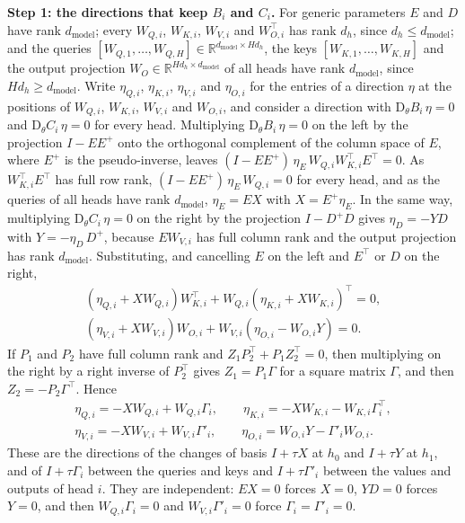 \documentclass[10pt]{article}
\theoremstyle{definition}
\theoremstyle{remark}
\newcommand{\R}{\mathbb{R}}
\newcommand{\dm}{d_{\mathrm{model}}}
\newcommand{\Der}{\mathrm{D}}
\newcommand{\para}[1]{\smallskip\noindent\textbf{#1}\hspace{0.5em}}
\begin{document}
\para{Step 1: the directions that keep $B_i$ and $C_i$.} For generic parameters $E$ and $D$ have rank $\dm$; every $W_{Q,i}$, $W_{K,i}$, $W_{V,i}$ and $W_{O,i}^\top$ has rank $d_h$, since $d_h \le \dm$; and the queries $[W_{Q,1}, \dots, W_{Q,H}] \in \R^{\dm\times Hd_h}$, the keys $[W_{K,1}, \dots, W_{K,H}]$ and the output projection $W_O \in \R^{Hd_h\times\dm}$ of all heads have rank $\dm$, since $Hd_h \ge \dm$. Write $\eta_{Q,i}$, $\eta_{K,i}$, $\eta_{V,i}$ and $\eta_{O,i}$ for the entries of a direction $\eta$ at the positions of $W_{Q,i}$, $W_{K,i}$, $W_{V,i}$ and $W_{O,i}$, and consider a direction with $\Der_\theta B_i\,\eta = 0$ and $\Der_\theta C_i\,\eta = 0$ for every head. Multiplying $\Der_\theta B_i\,\eta = 0$ on the left by the projection $I - EE^+$ onto the orthogonal complement of the column space of $E$, where $E^+$ is the pseudo-inverse, leaves $(I - EE^+)\,\eta_E\,W_{Q,i}W_{K,i}^\top E^\top = 0$. As $W_{K,i}^\top E^\top$ has full row rank, $(I - EE^+)\,\eta_E\,W_{Q,i} = 0$ for every head, and as the queries of all heads have rank $\dm$, $\eta_E = EX$ with $X = E^+\eta_E$. In the same way, multiplying $\Der_\theta C_i\,\eta = 0$ on the right by the projection $I - D^+D$ gives $\eta_D = -YD$ with $Y = -\eta_D\,D^+$, because $EW_{V,i}$ has full column rank and the output projection has rank $\dm$. Substituting, and cancelling $E$ on the left and $E^\top$ or $D$ on the right,
\begin{gather*}
(\eta_{Q,i} + XW_{Q,i})W_{K,i}^\top + W_{Q,i}(\eta_{K,i} + XW_{K,i})^\top = 0,\\
(\eta_{V,i} + XW_{V,i})W_{O,i} + W_{V,i}(\eta_{O,i} - W_{O,i}Y) = 0.
\end{gather*}
If $P_1$ and $P_2$ have full column rank and $Z_1P_2^\top + P_1Z_2^\top = 0$, then multiplying on the right by a right inverse of $P_2^\top$ gives $Z_1 = P_1\Gamma$ for a square matrix $\Gamma$, and then $Z_2 = -P_2\Gamma^\top$. Hence
\begin{gather*}
\eta_{Q,i} = -XW_{Q,i} + W_{Q,i}\Gamma_i, \qquad \eta_{K,i} = -XW_{K,i} - W_{K,i}\Gamma_i^\top, \\
\eta_{V,i} = -XW_{V,i} + W_{V,i}\Gamma'_i, \qquad \eta_{O,i} = W_{O,i}Y - \Gamma'_iW_{O,i} .
\end{gather*}
These are the directions of the changes of basis $I + \tau X$ at $h_0$ and $I + \tau Y$ at $h_1$, and of $I + \tau \Gamma_i$ between the queries and keys and $I + \tau \Gamma'_i$ between the values and outputs of head $i$. They are independent: $EX = 0$ forces $X = 0$, $YD = 0$ forces $Y = 0$, and then $W_{Q,i}\Gamma_i = 0$ and $W_{V,i}\Gamma'_i = 0$ force $\Gamma_i = \Gamma'_i = 0$.
\end{document}
